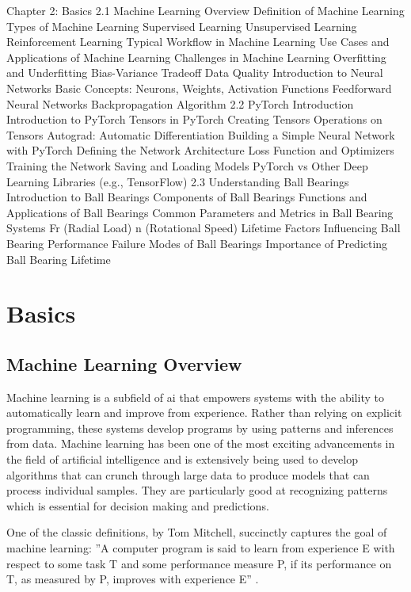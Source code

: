 Chapter 2: Basics
2.1 Machine Learning Overview
Definition of Machine Learning
Types of Machine Learning
Supervised Learning
Unsupervised Learning
Reinforcement Learning
Typical Workflow in Machine Learning
Use Cases and Applications of Machine Learning
Challenges in Machine Learning
Overfitting and Underfitting
Bias-Variance Tradeoff
Data Quality
Introduction to Neural Networks
Basic Concepts: Neurons, Weights, Activation Functions
Feedforward Neural Networks
Backpropagation Algorithm
2.2 PyTorch Introduction
Introduction to PyTorch
Tensors in PyTorch
Creating Tensors
Operations on Tensors
Autograd: Automatic Differentiation
Building a Simple Neural Network with PyTorch
Defining the Network Architecture
Loss Function and Optimizers
Training the Network
Saving and Loading Models
PyTorch vs Other Deep Learning Libraries (e.g., TensorFlow)
2.3 Understanding Ball Bearings
Introduction to Ball Bearings
Components of Ball Bearings
Functions and Applications of Ball Bearings
Common Parameters and Metrics in Ball Bearing Systems
Fr (Radial Load)
n (Rotational Speed)
Lifetime
Factors Influencing Ball Bearing Performance
Failure Modes of Ball Bearings
Importance of Predicting Ball Bearing Lifetime


\chapter{Basics}
\label{sec:basics}

\section{Machine Learning Overview}

Machine learning is a subfield of \ac{ai} that empowers systems with the ability to automatically learn and improve from experience. Rather than relying on explicit programming, these systems develop programs by using patterns and inferences from data. Machine learning has been one of the most exciting advancements in the field of artificial intelligence and is extensively being used to develop algorithms that can crunch through large data to produce models that can process individual samples. They are particularly good at recognizing patterns which is essential for decision making and predictions.

One of the classic definitions, by Tom Mitchell, succinctly captures the goal of machine learning: ''A computer program is said to learn from experience E with respect to some task T and some performance measure P, if its performance on T, as measured by P, improves with experience E'' \cite[2]{mitchell1997machine}.

